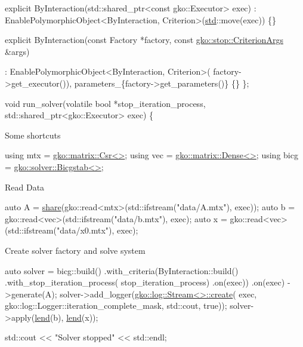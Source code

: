 \begin{DoxyCode}
    \textcolor{keyword}{explicit} ByInteraction(std::shared\_ptr<const gko::Executor> exec)
        : EnablePolymorphicObject<ByInteraction, Criterion>(\hyperlink{namespacestd}{std}::move(exec))
    \{\}

    \textcolor{keyword}{explicit} ByInteraction(\textcolor{keyword}{const} Factory *factory,
                           \textcolor{keyword}{const} \hyperlink{structgko_1_1stop_1_1CriterionArgs}{gko::stop::CriterionArgs} &args)

        : EnablePolymorphicObject<ByInteraction, Criterion>(
              factory->get\_executor()),
          parameters\_\{factory->get\_parameters()\}
    \{\}
\};


\textcolor{keywordtype}{void} run\_solver(\textcolor{keyword}{volatile} \textcolor{keywordtype}{bool} *stop\_iteration\_process,
                std::shared\_ptr<gko::Executor> exec)
\{
\end{DoxyCode}


Some shortcuts


\begin{DoxyCode}
\textcolor{keyword}{using} mtx = \hyperlink{classgko_1_1matrix_1_1Csr}{gko::matrix::Csr<>};
\textcolor{keyword}{using} vec = \hyperlink{classgko_1_1matrix_1_1Dense}{gko::matrix::Dense<>};
\textcolor{keyword}{using} bicg = \hyperlink{classgko_1_1solver_1_1Bicgstab}{gko::solver::Bicgstab<>};
\end{DoxyCode}


Read Data


\begin{DoxyCode}
\textcolor{keyword}{auto} A = \hyperlink{namespacegko_a3ce296f73db0ff398bdea6009a3a5c58}{share}(gko::read<mtx>(std::ifstream(\textcolor{stringliteral}{"data/A.mtx"}), exec));
\textcolor{keyword}{auto} b = gko::read<vec>(std::ifstream(\textcolor{stringliteral}{"data/b.mtx"}), exec);
\textcolor{keyword}{auto} x = gko::read<vec>(std::ifstream(\textcolor{stringliteral}{"data/x0.mtx"}), exec);
\end{DoxyCode}


Create solver factory and solve system


\begin{DoxyCode}
\textcolor{keyword}{auto} solver = bicg::build()
                  .with\_criteria(ByInteraction::build()
                                     .with\_stop\_iteration\_process(
                                         stop\_iteration\_process)
                                     .on(exec))
                  .on(exec)
                  ->generate(A);
solver->add\_logger(\hyperlink{classgko_1_1log_1_1Stream}{gko::log::Stream<>::create}(
    exec, gko::log::Logger::iteration\_complete\_mask, std::cout, \textcolor{keyword}{true}));
solver->apply(\hyperlink{namespacegko_aa8cb4876b72e5e1036ea9575443c439b}{lend}(b), \hyperlink{namespacegko_aa8cb4876b72e5e1036ea9575443c439b}{lend}(x));

std::cout << \textcolor{stringliteral}{"Solver stopped"} << std::endl;
\end{DoxyCode}


